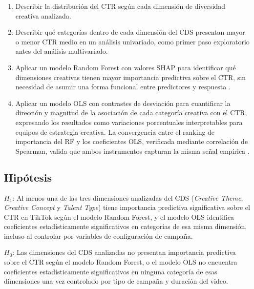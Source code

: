 \documentclass[12pt, a4paper]{report}
\begin{document}
\begin{enumerate}
  \item Describir la distribución del CTR según cada dimensión de diversidad creativa
        analizada.
  \item Describir qué categorías dentro de cada dimensión del CDS presentan mayor
        o menor CTR medio en un análisis univariado, como primer paso exploratorio
        antes del análisis multivariado.
  \item Aplicar un modelo Random Forest con valores SHAP para identificar qué dimensiones
        creativas tienen mayor importancia predictiva sobre el CTR, sin necesidad de asumir
        una forma funcional entre predictores y respuesta \citep{lundberg2017, strobl2007}.
  \item Aplicar un modelo OLS con contrastes de desviación para cuantificar la dirección
        y magnitud de la asociación de cada categoría creativa con el CTR, expresando los
        resultados como variaciones porcentuales interpretables para equipos de estrategia
        creativa. La convergencia entre el ranking de importancia del RF y los coeficientes
        OLS, verificada mediante correlación de Spearman, valida que ambos instrumentos
        capturan la misma señal empírica \citep{breiman2001b, mullainathan2017}.
\end{enumerate}

\subsection{Hipótesis}

$H_1$: Al menos una de las tres dimensiones analizadas del CDS (\textit{Creative Theme},
\textit{Creative Concept} y \textit{Talent Type}) tiene importancia predictiva
significativa sobre el CTR en TikTok según el modelo Random Forest, y el modelo OLS
identifica coeficientes estadísticamente significativos en categorías de esa misma
dimensión, incluso al controlar por variables de configuración de campaña.

$H_0$: Las dimensiones del CDS analizadas no presentan importancia predictiva sobre el
CTR según el modelo Random Forest, o el modelo OLS no encuentra coeficientes
estadísticamente significativos en ninguna categoría de esas dimensiones una vez
controlado por tipo de campaña y duración del video.

\end{document}

